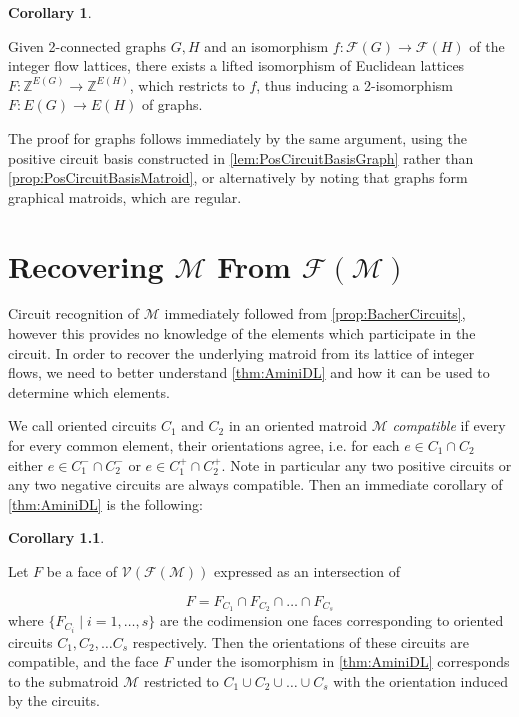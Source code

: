 \documentclass[12pt]{report}
\theoremstyle{definition}
\newtheorem{corollary}[theorem]{Corollary}
\def\Z{\mathbb Z}
\def\calF{\mathcal F}
\def\calM{\mathcal M}
\def\calV{\mathcal V}
\theoremstyle{upright}
\begin{document}
\begin{corollary}\label{cor:StrongTorelliGraph}

    Given 2-connected graphs $G, H$ and an isomorphism $f:\calF(G)\to\calF(H)$ of the integer flow lattices, there exists a lifted isomorphism of Euclidean lattices $F:\Z^{E(G)}\to\Z^{E(H)}$, which restricts to $f$, thus inducing a 2-isomorphism $F:E(G)\to E(H)$ of graphs.
    
\end{corollary}

The proof for graphs follows immediately by the same argument, using the positive circuit basis constructed in \cref{lem:PosCircuitBasisGraph} rather than \cref{prop:PosCircuitBasisMatroid}, or alternatively by noting that graphs form graphical matroids, which are regular.

\newpage

\chapter{Recovering $\calM$ From $\calF(\calM)$}
\label{chap:RecoveringMatroid}

Circuit recognition of $\calM$ immediately followed from \cref{prop:BacherCircuits}, however this provides no knowledge of the elements which participate in the circuit.
In order to recover the underlying matroid from its lattice of integer flows, we need to better understand \cref{thm:AminiDL} and how it can be used to determine which elements.

We call oriented circuits $C_1$ and $C_2$ in an oriented matroid $\calM$ \textit{compatible} if every for every common element, their orientations agree, i.e. for each $e\in C_1\cap C_2$ either $e\in C_1^-\cap C_2^-$ or $e\in C_1^+\cap C_2^+$.
Note in particular any two positive circuits or any two negative circuits are always compatible.
Then an immediate corollary of \cref{thm:AminiDL} is the following:

\begin{corollary}\label{cor:AminiFaces}

    Let $F$ be a face of $\calV(\calF(\calM))$ expressed as an intersection of

    \[F=F_{C_1}\cap F_{C_2}\cap\dots\cap F_{C_s}\]
    where $\{F_{C_i}\;|\;i=1, \dots, s\}$ are the codimension one faces corresponding to oriented circuits $C_1, C_2, \dots C_s$ respectively.
    Then the orientations of these circuits are compatible, and the face $F$ under the isomorphism in \cref{thm:AminiDL} corresponds to the submatroid $\calM$ restricted to $C_1\cup C_2\cup\dots\cup C_s$ with the orientation induced by the circuits.
    
\end{corollary}
\end{document}
